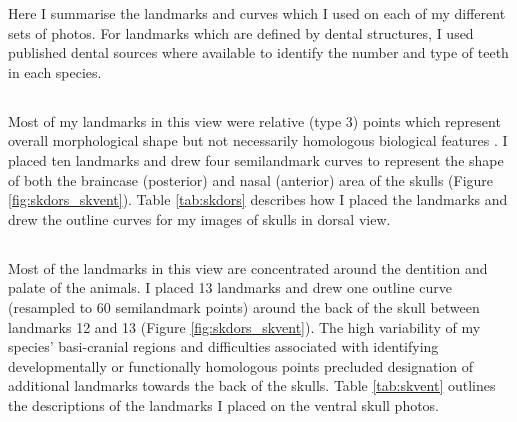 	Here I summarise the landmarks and curves which I used on each of my different sets of photos. For landmarks which are defined by dental structures, I used published dental sources \citep{Repenning1967, Eisenberg1969, Nowak1983, MacPhee1987, KnoxJones1992, Davis1997, Querouil2001, Nagorsen2002, Wilson2005, Goodman2006, Karatas2007, Hoffmann2008, Asher2008,  Muldoon2009, Lin2010} where available to identify the number and type of teeth in each species.
	
\subsection{}
	Most of my landmarks in this view were relative (type 3) points which represent overall morphological shape but not necessarily homologous biological features \citep{Zelditch2012}. I placed ten landmarks and drew four semilandmark curves to represent the shape of both the braincase (posterior) and nasal (anterior) area of the skulls (Figure \ref{fig:skdors_skvent}). Table \ref{tab:skdors} describes how I placed the landmarks and drew the outline curves for my images of skulls in dorsal view.

\subsection{}

	Most of the landmarks in this view are concentrated around the dentition and palate of the animals. I placed 13 landmarks and drew one outline curve (resampled to 60 semilandmark points) around the back of the skull between landmarks 12 and 13 (Figure \ref{fig:skdors_skvent}). The high variability of my species' basi-cranial regions and difficulties associated with identifying developmentally or functionally homologous points precluded designation of additional landmarks towards the back of the skulls. Table \ref{tab:skvent} outlines the descriptions of the landmarks I placed on the ventral skull photos.


